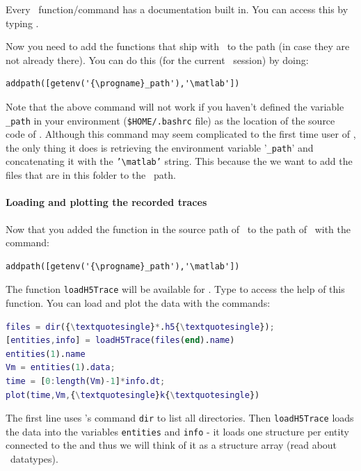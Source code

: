 Every \matlab\ function/command has a documentation built in. You can access this by typing .

Now you need to add the functions that ship with \progname\ to the path (in case they are not already there). You can do this (for the current \matlab\ session) by doing:

\begin{lstlisting}[escapeinside=\{\}]
addpath([getenv('{\progname}_path'),'\matlab'])
\end{lstlisting}

Note that the above command will not work if you haven't defined the variable \texttt{\progname\_path} in your environment (\texttt{\$HOME/.bashrc} file) as the location of the source code of \progname. Although this command may seem complicated to the first time user of \matlab, the only thing it does is retrieving the environment variable '\texttt{\progname\_path}' and concatenating it with the \texttt{'\textbackslash matlab'} string. This because the we want to add the files that are in this folder to the \matlab\ path.

\paragraph{Loading and plotting the recorded traces}
Now that you added the function in the source path of \progname\ to the path of \matlab\ with the command:

\begin{lstlisting}[escapeinside=\{\}]
addpath([getenv('{\progname}_path'),'\matlab'])
\end{lstlisting}

The function \texttt{loadH5Trace} will be available for \matlab. Type  to access the help of this function.
You can load and plot the data with the commands:

\begin{lstlisting}[language=matlab,morekeywords={loadH5Trace,ls},escapeinside=\{\}]
files = dir({\textquotesingle}*.h5{\textquotesingle});
[entities,info] = loadH5Trace(files(end).name)
entities(1).name
Vm = entities(1).data;
time = [0:length(Vm)-1]*info.dt;
plot(time,Vm,{\textquotesingle}k{\textquotesingle})
\end{lstlisting}

The first line uses \matlab 's command \texttt{dir} to list all directories. Then \texttt{loadH5Trace} loads the data into the variables \texttt{entities} and \texttt{info} -  it loads one structure per entity connected to the  and thus we will think of it as a structure array (read about \matlab\ datatypes).

